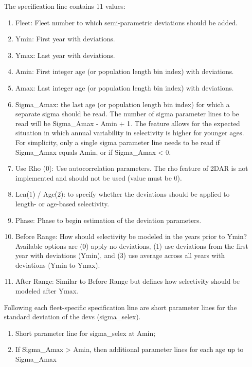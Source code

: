 The specification line contains 11 values:
\begin{enumerate}
	\item Fleet: Fleet number to which semi-parametric deviations should be added.
	\item Ymin: First year with deviations.
	\item Ymax: Last year with deviations.
	\item Amin: First integer age (or population length bin index) with deviations.
	\item Amax: Last integer age (or population length bin index) with deviations.
	\item Sigma\_Amax: the last age (or population length bin index) for which a separate sigma should be read. The number of sigma parameter lines to be read will be Sigma\_Amax - Amin + 1. The feature allows for the expected situation in which annual variability in selectivity is higher for younger ages. For simplicity, only a single sigma parameter line needs to be read if Sigma\_Amax equals Amin, or if Sigma\_Amax < 0.
	\item Use Rho (0): Use autocorrelation parameters. The rho feature of 2DAR is not implemented and should not be used (value must be 0).
	\item Len(1) / Age(2): to specify whether the deviations should be applied to length- or age-based selectivity.
	\item Phase: Phase to begin estimation of the deviation parameters.
	\item Before Range: How should selectivity be modeled in the years prior to Ymin? Available options are (0) apply no deviations, (1) use deviations from the first year with deviations (Ymin), and (3) use average across all years with deviations (Ymin to Ymax).
	\item After Range: Similar to Before Range but defines how selectivity should be modeled after Ymax.
\end{enumerate}

Following each fleet-specific specification line are short parameter lines for the standard deviation of the devs (sigma\_selex).

\begin{enumerate}
	\item Short parameter line for sigma\_selex at Amin;
	\item If Sigma\_Amax > Amin, then additional parameter lines for each age up to Sigma\_Amax
\end{enumerate}

